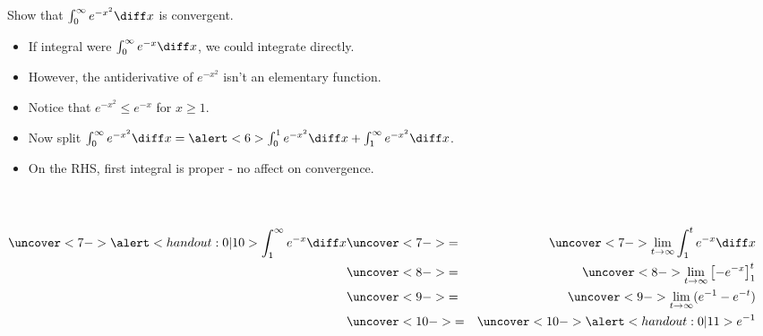 \begin{frame}
\begin{example} %
Show that $\int_0^\infty e^{-x^2}\diff x$ is convergent.
\begin{itemize}
\item<2-> If integral were $\int_{0}^{\infty} e^{-x}\diff x$, we could integrate directly. 
\item<3->  However, the antiderivative of $e^{-x^2}$ isn't an elementary function.
\item<4-| alert@10> Notice that $e^{-x^2} \leq e^{-x}$ for $x\geq 1$.
\item<5-> Now split $\int_0^\infty e^{-x^2}\diff x = \alert<6>{ \int_0^1 e^{-x^2}\diff x} + \int_1^\infty e^{-x^2}\diff x$.
\item<6->  On the RHS, first integral is proper - no affect on convergence.
\end{itemize}
\begin{columns}[c]
\ %
\begin{eqnarray*}
\uncover<7->{%
\alert<handout:0| 10>{\int_1^\infty e^{-x}\diff x}%
}%
& \uncover<7->{ = } & %
\uncover<7->{%
\lim_{t\rightarrow \infty} \int_1^t e^{-x}\diff x%
}\\%
& \uncover<8->{ = } & %
\uncover<8->{%
\lim_{t\rightarrow \infty} \left[ -e^{-x}\right]_1^t
}\\%
& \uncover<9->{ = } & %
\uncover<9->{%
\lim_{t\rightarrow \infty} (e^{-1} - e^{-t})%
}\\%
& \uncover<10->{ = } & %
\uncover<10->{%
\alert<handout:0| 11>{e^{-1}}
}%
\end{eqnarray*}
\end{columns}
%
\end{example}
\end{frame}
